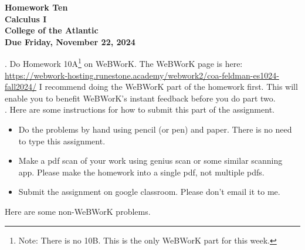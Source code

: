 \documentclass[12pt]{extarticle}
\begin{document}
\pagestyle{empty}
 
\begin{center}
{\LARGE {\bf Homework Ten}}\\
\bigskip
{\Large {\bf Calculus I}}\\
\bigskip
{\Large {\bf College of the Atlantic}}\\
\bigskip
{ {\bf Due Friday, November 22, 2024}}\\ 
\end{center}
\medskip


. Do Homework 10A\footnote{Note: There
  is no 10B. This is the only WeBWorK part for this week.} on 
WeBWorK. The WeBWorK page is here:
\url{https://webwork-hosting.runestone.academy/webwork2/coa-feldman-es1024-fall2024/}
I recommend doing the WeBWorK part of the homework first.  This will
enable you to benefit WeBWorK's instant feedback before you do part
two.\\ 


.  Here are some
instructions for how to submit this part of the assignment.
\begin{itemize}
  \setlength{\itemsep}{0mm}
\item Do the problems by hand using pencil (or pen) and paper.
  There is no need to type this assignment.
\item Make a pdf scan of your work using genius scan or some
  similar scanning app.  Please make the homework into a single
  pdf, not multiple pdfs.
\item Submit the assignment on google classroom.  Please don't
  email it to me.
\end{itemize}

\noindent Here are some non-WeBWorK problems.
\end{document}
